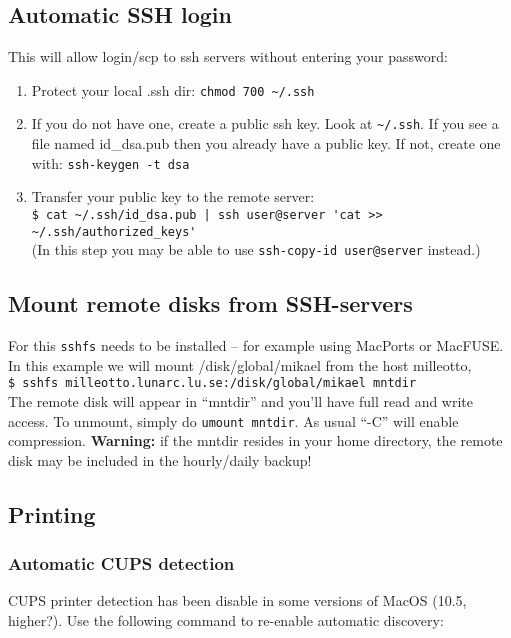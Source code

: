 \documentclass[a4paper,10pt]{article}
\begin{document}
\subsection{Automatic SSH login}
This will allow login/scp to ssh servers without entering your password:
\begin{enumerate}
\item Protect your local .ssh dir: \verb"chmod 700 ~/.ssh"

\item If you do not have one, create a public ssh key.
Look at \verb"~/.ssh". If you see a file named id\_dsa.pub then you already have a public key. If not, create one with: \verb"ssh-keygen -t dsa"

\item Transfer your public key to the remote server:\\

\verb"$ cat ~/.ssh/id_dsa.pub | ssh user@server 'cat >> ~/.ssh/authorized_keys'"\\

(In this step you may be able to use \verb"ssh-copy-id user@server" instead.)
\end{enumerate}

\subsection{Mount remote disks from SSH-servers}
For this \verb+sshfs+ needs to be installed -- for example using MacPorts or MacFUSE. In this example we will mount /disk/global/mikael from the host milleotto,\\

\verb+$ sshfs milleotto.lunarc.lu.se:/disk/global/mikael mntdir+\\

\noindent The remote disk will appear in ``mntdir'' and you'll have full read and write access. To unmount, simply do \verb+umount mntdir+. As usual ``-C'' will enable compression. \textbf{Warning:} if the mntdir resides in your home directory, the remote disk may be included in the hourly/daily backup!

\subsection{Printing}
\subsubsection{Automatic CUPS detection}
CUPS printer detection has been disable in some versions of MacOS (10.5, higher?). Use the following command to re-enable automatic discovery:\\
\end{document}

